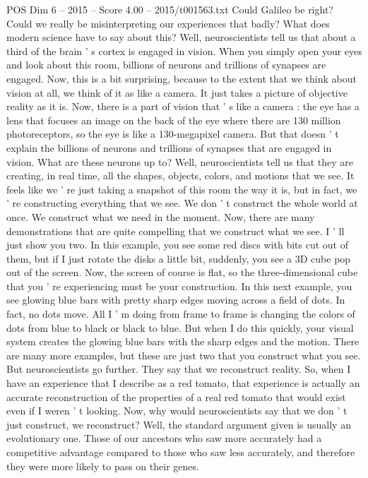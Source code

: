 \begin{textsample}{POS Dim 6 – 2015 – Score 4.00 – 2015/t001563.txt}
Could Galileo be right?
Could we really be misinterpreting our experiences that badly?
What does modern science have to say about this?
Well, neuroscientists tell us that about a third of the brain ' s cortex is engaged in vision.
When you simply open your eyes and look about this room, billions of neurons and trillions of synapses are engaged.
Now, this is a bit surprising, because to the extent that we think about vision at all, we think of it as like a camera.
It just takes a picture of objective reality as it is.
Now, there is a part of vision that ' s like a camera : the eye has a lens that focuses an image on the back of the eye where there are 130 million photoreceptors, so the eye is like a 130-megapixel camera.
But that doesn ' t explain the billions of neurons and trillions of synapses that are engaged in vision.
What are these neurons up to?
Well, neuroscientists tell us that they are creating, in real time, all the shapes, objects, colors, and motions that we see.
It feels like we ' re just taking a snapshot of this room the way it is, but in fact, we ' re constructing everything that we see.
We don ' t construct the whole world at once.
We construct what we need in the moment.
Now, there are many demonstrations that are quite compelling that we construct what we see.
I ' ll just show you two.
In this example, you see some red discs with bits cut out of them, but if I just rotate the disks a little bit, suddenly, you see a 3D cube pop out of the screen.
Now, the screen of course is flat, so the three-dimensional cube that you ' re experiencing must be your construction.
In this next example, you see glowing blue bars with pretty sharp edges moving across a field of dots.
In fact, no dots move.
All I ' m doing from frame to frame is changing the colors of dots from blue to black or black to blue.
But when I do this quickly, your visual system creates the glowing blue bars with the sharp edges and the motion.
There are many more examples, but these are just two that you construct what you see.
But neuroscientists go further.
They say that we reconstruct reality.
So, when I have an experience that I describe as a red tomato, that experience is actually an accurate reconstruction of the properties of a real red tomato that would exist even if I weren ' t looking.
Now, why would neuroscientists say that we don ' t just construct, we reconstruct?
Well, the standard argument given is usually an evolutionary one.
Those of our ancestors who saw more accurately had a competitive advantage compared to those who saw less accurately, and therefore they were more likely to pass on their genes.

\end{textsample}
